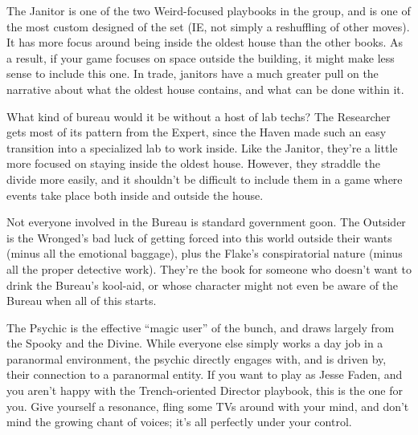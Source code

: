 \documentclass[12pt,oneside,landscape]{memoir}
\begin{document}
\begin{multicols}{3}
{The Janitor is one of the two Weird-focused playbooks in the group, and is one of the most custom designed of the set (IE, not simply a reshuffling of other moves).  It has more focus around being inside the oldest house than the other books.  As a result, if your game focuses on space outside the building, it might make less sense to include this one.  In trade, janitors have a much greater pull on the narrative about what the oldest house contains, and what can be done within it.}

{What kind of bureau would it be without a host of lab techs?  The Researcher gets most of its pattern from the Expert, since the Haven made such an easy transition into a specialized lab to work inside.  Like the Janitor, they’re a little more focused on staying inside the oldest house.  However, they straddle the divide more easily, and it shouldn’t be difficult to include them in a game where events take place both inside and outside the house.}

{Not everyone involved in the Bureau is standard government goon.  The Outsider is the Wronged’s bad luck of getting forced into this world outside their wants (minus all the emotional baggage), plus the Flake’s conspiratorial nature (minus all the proper detective work).  They’re the book for someone who doesn’t want to drink the Bureau’s kool-aid, or whose character might not even be aware of the Bureau when all of this starts.}

{The Psychic is the effective “magic user” of the bunch, and draws largely from the Spooky and the Divine.  While everyone else simply works a day job in a paranormal environment, the psychic directly engages with, and is driven by, their connection to a paranormal entity.  If you want to play as Jesse Faden, and you aren’t happy with the Trench-oriented Director playbook, this is the one for you.  Give yourself a resonance, fling some TVs around with your mind, and don’t mind the growing chant of voices; it’s all perfectly under your control.}

\end{multicols}
\pagebreak

\pagebreak

\end{document}
